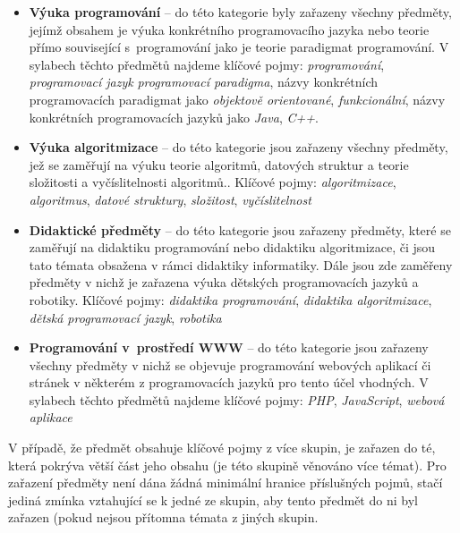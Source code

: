 \documentclass[FP,DP]{tulthesis}
\begin{document}
{{{{{{{\vspace{2mm}\begin{itemize}
\setlength\itemsep{0.2em}
  	\item \textbf{Výuka programování} -- do této kategorie byly zařazeny všechny předměty, jejímž obsahem je výuka konkrétního programovacího jazyka nebo teorie přímo související s~programování jako je teorie paradigmat programování. V sylabech těchto předmětů najdeme klíčové pojmy: \textit{programování}, \textit{programovací jazyk} \textit{programovací paradigma}, názvy konkrétních programovacích paradigmat jako \textit{objektově orientované}, \textit{funkcionální},  názvy konkrétních programovacích jazyků jako \textit{Java}, \textit{C++}.
\item \textbf{Výuka algoritmizace} -- do této kategorie jsou zařazeny všechny předměty, jež se zaměřují na výuku teorie algoritmů, datových struktur a teorie složitosti a vyčíslitelnosti algoritmů.. Klíčové pojmy: \textit{algoritmizace}, \textit{algoritmus}, \textit{datové struktury}, \textit{složitost}, \textit{vyčíslitelnost}
\item \textbf{Didaktické předměty} -- do této kategorie jsou zařazeny předměty, které se zaměřují na didaktiku programování nebo didaktiku algoritmizace, či jsou tato témata obsažena v rámci didaktiky informatiky. Dále jsou zde zaměřeny předměty v nichž je zařazena výuka dětských programovacích jazyků a robotiky. Klíčové pojmy: \textit{didaktika programování}, \textit{didaktika algoritmizace}, \textit{dětská programovací jazyk}, \textit{robotika}
	\item \textbf{Programování v~prostředí WWW } -- do této kategorie jsou zařazeny všechny předměty v nichž se objevuje programování webových aplikací či stránek v některém z programovacích jazyků pro tento účel vhodných. V sylabech těchto předmětů najdeme klíčové pojmy: \textit{PHP}, \textit{JavaScript}, \textit{webová aplikace}
\end{itemize}
V případě, že předmět obsahuje klíčové pojmy z více skupin, je zařazen do té, která pokrýva větší část jeho obsahu (je této skupině věnováno více témat). Pro zařazení předměty není dána žádná minimální hranice příslušných pojmů, stačí jediná zmínka vztahující se k jedné ze skupin, aby tento předmět do ni byl zařazen (pokud nejsou přítomna témata z jiných skupin. 
\begin{figure}[h!]
\centering
{}


\end{figure}}}}}}}}
\end{document}
